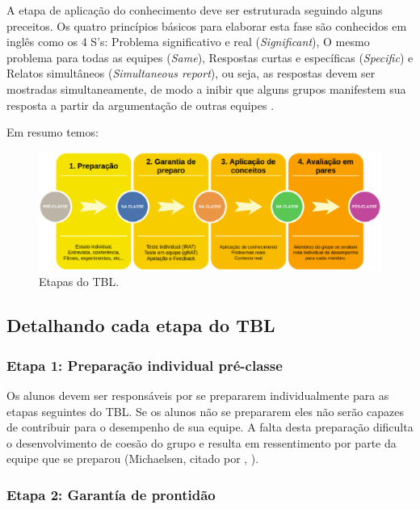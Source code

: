 A etapa de aplicação do conhecimento deve ser estruturada seguindo alguns preceitos. Os quatro princípios básicos para elaborar esta fase são conhecidos em inglês como os 4 S’s: Problema significativo e real (\textit{Significant}), O mesmo problema para todas as equipes (\textit{Same}), Respostas curtas e específicas (\textit{Specific}) e Relatos simultâneos (\textit{Simultaneous report}), ou seja, as respostas devem ser mostradas simultaneamente, de modo a inibir que alguns grupos manifestem sua resposta a partir da argumentação de outras equipes \cite{bollela}.

Em resumo temos:

\begin{figure}[h!]
	\centering
  \includegraphics[keepaspectratio=true,scale=0.5]{figuras/tbl2.eps}
  \caption{Etapas do TBL.}
	\label{fig:tbl2}
\end{figure}

\subsection{Detalhando cada etapa do TBL}

\subsubsection{Etapa 1: Preparação individual pré-classe}

Os alunos devem ser responsáveis por se prepararem individualmente para as etapas seguintes do TBL. Se os alunos não se prepararem eles não serão capazes de contribuir para o desempenho de sua equipe. A falta desta preparação dificulta o desenvolvimento de coesão do grupo e resulta em ressentimento por parte da equipe que se preparou (Michaelsen, citado por \citeauthor{bollela}, \citeyear{bollela}).

\subsubsection{Etapa 2: Garantía de prontidão}

